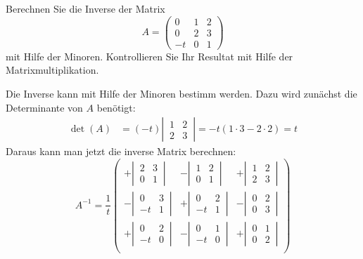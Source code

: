 Berechnen Sie die Inverse der Matrix
\[
A=
\begin{pmatrix}
 0& 1& 2\\
 0& 2& 3\\
-t& 0& 1
\end{pmatrix}
\]
mit Hilfe der Minoren. Kontrollieren Sie Ihr Resultat
mit Hilfe der Matrixmultiplikation.

\begin{loesung}
Die Inverse kann mit Hilfe der Minoren bestimm werden. Dazu wird zunächst die
Determinante von $A$ benötigt:
\begin{align*}
\det(A)&=(-t)\left|\,
\begin{matrix}
1&2\\2&3
\end{matrix}
\,\right|
=
-t(1\cdot 3-2\cdot 2)=t
\end{align*}
Daraus kann man jetzt die inverse Matrix berechnen:
\[
A^{-1}
=
\frac1t
\begin{pmatrix}
 +\left|\,\begin{matrix} 2&3\\0&1\end{matrix}\,\right|
&-\left|\,\begin{matrix} 1&2\\0&1\end{matrix}\,\right|
&+\left|\,\begin{matrix} 1&2\\2&3\end{matrix}\,\right|\\
 -\left|\,\begin{matrix} 0&3\\-t&1\end{matrix}\,\right|
&+\left|\,\begin{matrix} 0&2\\-t&1\end{matrix}\,\right|
&-\left|\,\begin{matrix} 0&2\\0&3\end{matrix}\,\right|\\
 +\left|\,\begin{matrix} 0&2\\-t&0\end{matrix}\,\right|
&-\left|\,\begin{matrix} 0&1\\-t&0\end{matrix}\,\right|
&+\left|\,\begin{matrix} 0&1\\0&2\end{matrix}\,\right|\\

\end{pmatrix}\]
\end{loesung}

